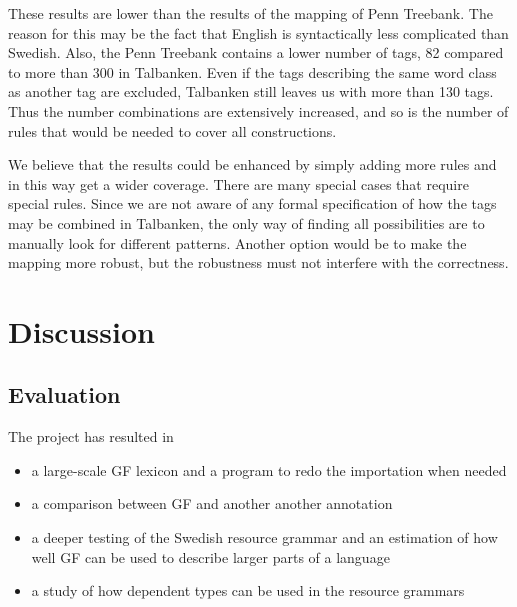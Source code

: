 \documentclass{report}
\begin{document}
These results are lower than the results of the mapping of Penn Treebank. The
reason for this may be the fact that English is syntactically less complicated
than Swedish. Also, the Penn Treebank contains a lower number of tags, 82 compared
to more than 300 in Talbanken. Even if the tags describing the same word
class as another tag are excluded, Talbanken still leaves us with more than 130 tags.
Thus the number combinations are extensively increased, and so is the number of
rules that would be needed to cover all constructions.

We believe that the results could be enhanced by simply adding more rules 
and in this way get a wider coverage. There are many special cases that require
special rules. Since we are not aware of any formal specification of how the tags may be
combined in Talbanken, the only way of finding all possibilities are to manually look
for different patterns. Another option would be to make the mapping more
robust, but the robustness must not interfere with the correctness.





\chapter{Discussion}
\label{sec:results}
\section{Evaluation}
The project has resulted in
\begin{itemize}
\item a large-scale GF lexicon and a program to redo the importation when needed
\item a comparison between GF and another another annotation
\item a deeper testing of the Swedish resource grammar and an estimation
of how well GF can be used to describe larger parts of a language
\item a study of how dependent types can be used in the resource grammars
\end{itemize}
\end{document}

